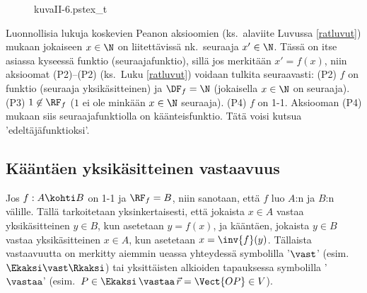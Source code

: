 \begin{figure}[H]
\begin{center}
{kuvaII-6.pstex_t}
\end{center}
\end{figure}
\begin{Exa} Luonnollisia lukuja koskevien Peanon aksioomien (ks.\ alaviite Luvussa
\ref{ratluvut}) mukaan jokaiseen $x\in\N$ on liitettävissä nk.\ seuraaja $x'\in\N$.
Tässä on itse asiassa kyseessä funktio (seuraajafunktio), sillä jos merkitään $x'=f(x)$, niin
aksioomat (P2)--(P2) (ks.\ Luku \ref{ratluvut}) voidaan tulkita seuraavasti: (P2) $f$ on
funktio (seuraaja yksikäsitteinen) ja $\DF_f=\N$ (jokaisella $x\in\N$ on seuraaja).
(P3) $1\not\in\RF_f$ ($1$ ei ole minkään $x\in\N$ seuraaja). (P4) $f$ on 1-1. 
Aksiooman (P4) mukaan siis seuraajafunktiolla on käänteisfunktio. Tätä voisi kutsua
'edeltäjäfunktioksi'. \loppu
\end{Exa}

\subsection*{Kääntäen yksikäsitteinen vastaavuus}

Jos $f: A \kohti B$ on 1-1 ja $\RF_f=B$, niin sanotaan, että $f$ luo  $A$:n ja $B$:n välille. Tällä tarkoitetaan yksinkertaisesti,
että jokaista $x \in A$ vastaa yksikäsitteinen $y \in B$, kun asetetaan $y=f(x)$, ja kääntäen,
jokaista $y \in B$ vastaa yksikäsitteinen $x \in A$, kun asetetaan $x=\inv{f}(y)$. Tällaista
vastaavuutta on merkitty aiemmin ueassa yhteydessä symbolilla '$\vast$'
(esim.\ $\Ekaksi \vast \Rkaksi$) tai yksittäisten alkioiden tapauksessa symbolilla '$\vastaa$'
(esim.\ $P\in\Ekaksi\,\vastaa\,\vec r=\Vect{OP} \in V$). 